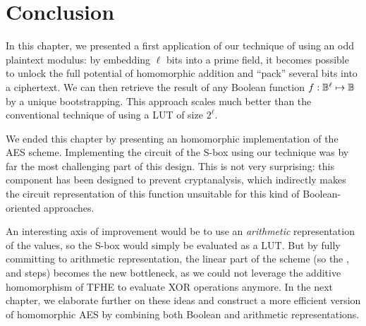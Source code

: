 \section{Conclusion}

In this chapter, we presented a first application of our technique of using an odd plaintext modulus: by embedding $\ell$ bits into a prime field, it becomes possible to unlock the full potential of homomorphic addition and ``pack'' several bits into a ciphertext. We can then retrieve the result of any Boolean function $f:\mathbb{B}^\ell \mapsto \mathbb{B}$ by a unique bootstrapping. This approach scales much better than the conventional technique of using a \gls{LUT} of size $2^\ell$.

We ended this chapter by presenting an homomorphic implementation of the \gls{AES} scheme. Implementing the circuit of the S-box using our technique was by far the most challenging part of this design. This is not very surprising: this component has been designed to prevent cryptanalysis,  which indirectly makes the circuit representation of this function unsuitable for this kind of Boolean-oriented approaches.

An interesting axis of improvement would be to use an \textit{arithmetic} representation of the values, so the S-box would simply be evaluated as a \gls{LUT}. But by fully committing to arithmetic representation, the linear part of the scheme (so the \ShiftRows, \MixColumns and \AddRoundKey steps) becomes the new bottleneck, as we could not leverage the additive homomorphism of \gls{TFHE} to evaluate XOR operations anymore. In the next chapter, we elaborate further on these ideas and construct a more efficient version of homomorphic \gls{AES} by combining both Boolean and arithmetic representations. 

